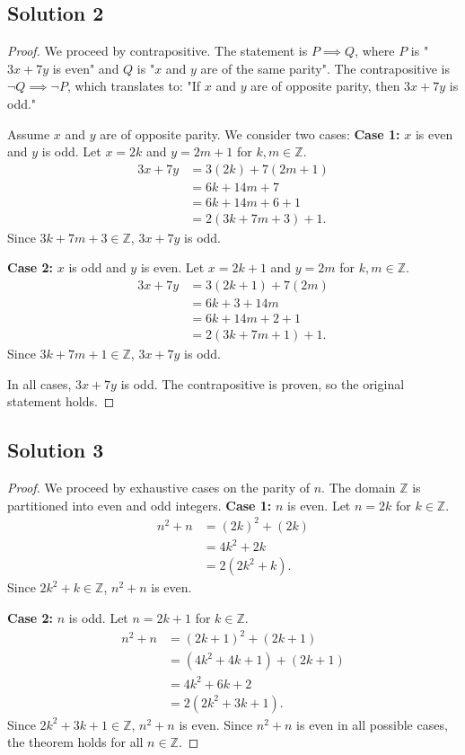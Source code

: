 \documentclass[11pt]{article}
\begin{document}
\subsection{Solution 2}
\begin{proof}
We proceed by contrapositive. The statement is $P \implies Q$, where $P$ is "$3x + 7y$ is even" and $Q$ is "$x$ and $y$ are of the same parity". The contrapositive is $\neg Q \implies \neg P$, which translates to: "If $x$ and $y$ are of opposite parity, then $3x + 7y$ is odd."

Assume $x$ and $y$ are of opposite parity. We consider two cases:
\textbf{Case 1:} $x$ is even and $y$ is odd. 
Let $x = 2k$ and $y = 2m + 1$ for $k, m \in \mathbb{Z}$.
\begin{align*}
3x + 7y &= 3(2k) + 7(2m + 1) \\
&= 6k + 14m + 7 \\
&= 6k + 14m + 6 + 1 \\
&= 2(3k + 7m + 3) + 1.
\end{align*}
Since $3k + 7m + 3 \in \mathbb{Z}$, $3x + 7y$ is odd.

\textbf{Case 2:} $x$ is odd and $y$ is even.
Let $x = 2k + 1$ and $y = 2m$ for $k, m \in \mathbb{Z}$.
\begin{align*}
3x + 7y &= 3(2k + 1) + 7(2m) \\
&= 6k + 3 + 14m \\
&= 6k + 14m + 2 + 1 \\
&= 2(3k + 7m + 1) + 1.
\end{align*}
Since $3k + 7m + 1 \in \mathbb{Z}$, $3x + 7y$ is odd.

In all cases, $3x + 7y$ is odd. The contrapositive is proven, so the original statement holds.
\end{proof}

\subsection{Solution 3}
\begin{proof}
We proceed by exhaustive cases on the parity of $n$. The domain $\mathbb{Z}$ is partitioned into even and odd integers.
\textbf{Case 1:} $n$ is even. Let $n = 2k$ for $k \in \mathbb{Z}$.
\begin{align*}
n^2 + n &= (2k)^2 + (2k) \\
&= 4k^2 + 2k \\
&= 2(2k^2 + k).
\end{align*}
Since $2k^2 + k \in \mathbb{Z}$, $n^2 + n$ is even.

\textbf{Case 2:} $n$ is odd. Let $n = 2k + 1$ for $k \in \mathbb{Z}$.
\begin{align*}
n^2 + n &= (2k + 1)^2 + (2k + 1) \\
&= (4k^2 + 4k + 1) + (2k + 1) \\
&= 4k^2 + 6k + 2 \\
&= 2(2k^2 + 3k + 1).
\end{align*}
Since $2k^2 + 3k + 1 \in \mathbb{Z}$, $n^2 + n$ is even.
Since $n^2 + n$ is even in all possible cases, the theorem holds for all $n \in \mathbb{Z}$.
\end{proof}
\end{document}
